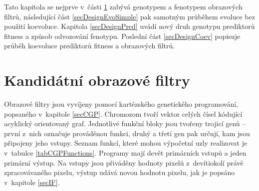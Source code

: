 Tato kapitola se nejprve v~části \ref{secDesignIF} zabývá genotypem a fenotypem obrazových filtrů, následující část \ref{secDesignEvoSimple} pak samotným průběhem evoluce bez použití koevoluce. Kapitola \ref{secDesignPred} uvádí nový druh genotypu prediktorů fitness a způsob odvozování fenotypu. Poslední část \ref{secDesignCoev} popisuje průběh koevoluce prediktorů fitness a obrazových filtrů.

\section{Kandidátní obrazové filtry}
\label{secDesignIF}

Obrazové filtry jsou vyvíjeny pomocí kartézského genetického programování, popsaného v~kapitole \ref{secCGP}. Chromozom tvoří vektor celých čísel kódující acyklický orientovaný graf. Jednotlivé funkční bloky jsou tvořeny trojicí genů -- první z~nich označuje prováděnou funkci, druhý a třetí gen pak určují, kam jsou připojeny jeho vstupy. Seznam funkcí, které mohou výpočetní uzly realizovat je v~tabulce \ref{tabCGPFunctions}. Programy mají devět primárních vstupů a jeden primární výstup. Na vstupy jsou přiváděny hodnoty pixelů z~devítiokolí právě zpracovávaného pixelu, výstup udává novou hodnotu pixelu, jak je popsáno v~kapitole \ref{secIF}.

